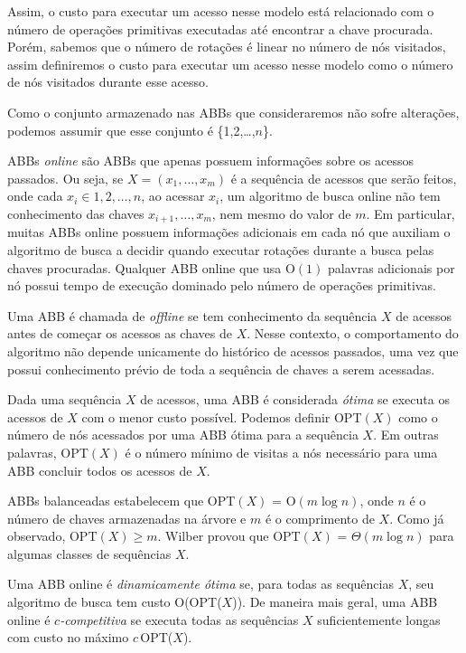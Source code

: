 Assim, o custo para executar um acesso nesse modelo está relacionado com o número de operações primitivas executadas até encontrar a chave procurada. Porém, sabemos que o número de rotações é linear no número de nós visitados, assim definiremos o custo para executar um acesso nesse modelo como o número de nós visitados durante esse acesso.

Como o conjunto armazenado nas ABBs que consideraremos não sofre alterações, podemos assumir que esse conjunto é \{1,2,\ldots,$n$\}.

ABBs \textit{online} são ABBs que apenas possuem informações sobre os acessos passados. Ou seja, se $X = (x_1, \ldots, x_m)$ é a sequência de acessos que serão feitos, onde cada $x_i \in {1,2,\ldots,n}$, ao acessar $x_{i}$, um algoritmo de busca online não tem conhecimento das chaves $x_{i+1},\ldots,x_{m}$, nem mesmo do valor de $m$. Em particular, muitas ABBs online possuem informações adicionais em cada nó que auxiliam o algoritmo de busca a decidir quando executar rotações durante a busca pelas chaves procuradas. Qualquer ABB online que usa O$(1)$ palavras adicionais por nó possui tempo de execução dominado pelo número de operações primitivas.

Uma ABB é chamada de \textit{offline} se tem conhecimento da sequência $X$ de acessos antes de começar os acessos as chaves de $X$. Nesse contexto, o comportamento do algoritmo não depende unicamente do histórico de acessos passados, uma vez que possui conhecimento prévio de toda a sequência de chaves a serem acessadas.

Dada uma sequência $X$ de acessos, uma ABB é considerada \textit{ótima} se executa os acessos de $X$ com o menor custo possível. Podemos definir OPT$(X)$ como o número de nós acessados por uma ABB ótima para a sequência $X$. Em outras palavras, OPT$(X)$ é o número mínimo de visitas a nós necessário para uma ABB concluir todos os acessos de $X$. 

ABBs balanceadas estabelecem que OPT$(X)$ = O$(m \log n)$, onde $n$ é o número de chaves armazenadas na árvore e $m$ é o comprimento de $X$. Como já observado, $\text{OPT}(X) \geq m$. Wilber \cite{lowerbound_wilbert} provou que OPT$(X)$ = $\Theta$$(m \log n)$ para algumas classes de sequências $X$. 

Uma ABB online é \textit{dinamicamente ótima} se, para todas as sequências $X$, seu algoritmo de busca tem custo O(OPT($X$)). De maneira mais geral, uma ABB online é \textit{$c$-competitiva} se executa todas as sequências $X$ suficientemente longas com custo no máximo $c$\,OPT($X$).

